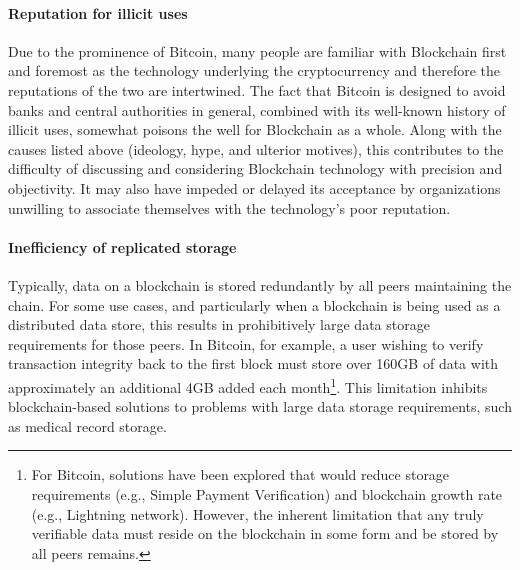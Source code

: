 \paragraph{Reputation for illicit uses}
Due to the prominence of Bitcoin, many people are familiar with Blockchain first and foremost as the technology underlying the cryptocurrency and therefore the reputations of the two are intertwined. The fact that Bitcoin is designed to avoid banks and central authorities in general, combined with its well-known history of illicit uses, somewhat poisons the well for Blockchain as a whole. Along with the causes listed above (ideology, hype, and ulterior motives), this contributes to the difficulty of discussing and considering Blockchain technology with precision and objectivity. It may also have impeded or delayed its acceptance by organizations unwilling to associate themselves with the technology's poor reputation.

\paragraph{Inefficiency of replicated storage}
Typically, data on a blockchain is stored redundantly by all peers maintaining the chain. For some use cases, and particularly when a blockchain is being used as a distributed data store, this results in prohibitively large data storage requirements for those peers. In Bitcoin, for example, a user wishing to verify transaction integrity back to the first block must store over 160GB of data\cite{BlockchainInfoSize} with approximately an additional 4GB added each month\footnote{For Bitcoin, solutions have been explored that would reduce storage requirements (e.g., Simple Payment Verification\cite{NakamotoS8}) and blockchain growth rate (e.g., Lightning network\cite{Poon16}). However, the inherent limitation that any truly verifiable data must reside on the blockchain in some form and be stored by all peers remains.}. This limitation inhibits blockchain-based solutions to problems with large data storage requirements, such as medical record storage.